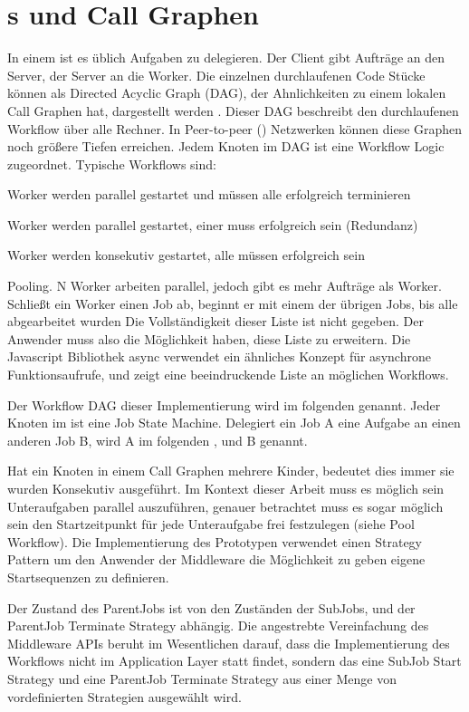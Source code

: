 \section{\JobTree s und Call Graphen}
In einem \hcsno{} ist es üblich Aufgaben zu delegieren. Der Client gibt Aufträge an den Server, der Server an die Worker.
Die einzelnen durchlaufenen Code Stücke können als Directed Acyclic Graph (DAG), der Ahnlichkeiten zu einem lokalen Call Graphen hat, dargestellt werden \cite{yu2005taxonomy}.
Dieser DAG beschreibt den durchlaufenen Workflow über alle Rechner.
In Peer-to-peer (\ptp{}) Netzwerken können diese Graphen noch größere Tiefen erreichen.
Jedem Knoten im DAG ist eine Workflow Logic zugeordnet. Typische Workflows sind:
\BCL
  \item Worker werden parallel gestartet und müssen alle erfolgreich terminieren
  \item Worker werden parallel gestartet, einer muss erfolgreich sein (Redundanz)
  \item Worker werden konsekutiv gestartet, alle müssen erfolgreich sein
  \item Pooling. N Worker arbeiten parallel, jedoch gibt es mehr Aufträge als Worker. Schließt ein Worker einen Job ab, beginnt er mit einem der übrigen Jobs, bis alle abgearbeitet wurden
\ECL
Die Vollständigkeit dieser Liste ist nicht gegeben.
Der Anwender muss also die Möglichkeit haben, diese Liste zu erweitern.
Die Javascript Bibliothek async \cite{async} verwendet ein ähnliches Konzept für asynchrone Funktionsaufrufe, und zeigt eine beeindruckende Liste an möglichen Workflows.

Der Workflow DAG dieser Implementierung wird im folgenden \JobTree{} genannt.
Jeder Knoten im \JobTree{} ist eine Job State Machine.
Delegiert ein Job A eine Aufgabe an einen anderen Job B, wird A im folgenden \ParentJob{}, und B \SubJob{} genannt.

Hat ein Knoten in einem Call Graphen mehrere Kinder, bedeutet dies immer sie wurden Konsekutiv ausgeführt.
Im Kontext dieser Arbeit muss es möglich sein Unteraufgaben parallel auszuführen, genauer betrachtet muss es sogar möglich sein den Startzeitpunkt für jede Unteraufgabe frei festzulegen (siehe Pool Workflow).
Die Implementierung des Prototypen verwendet einen Strategy Pattern \cite{Gamma05a} um den Anwender der Middleware die Möglichkeit zu geben eigene Startsequenzen zu definieren.

Der Zustand des ParentJobs ist von den Zuständen der SubJobs, und der ParentJob Terminate Strategy abhängig.
Die angestrebte Vereinfachung des Middleware APIs  beruht im Wesentlichen darauf, dass die Implementierung des Workflows nicht im Application Layer statt findet, sondern das eine SubJob Start Strategy und eine ParentJob Terminate Strategy aus einer Menge von vordefinierten  Strategien ausgewählt wird.






